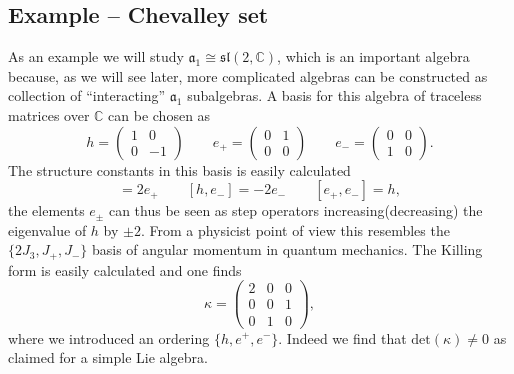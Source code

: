 \documentclass[11pt]{report}
\begin{document}
\subsection{Example -- Chevalley set}
As an example we will study $\mathfrak{a}_1\cong\mathfrak{sl}(2,\mathbb{C})$, which is an important algebra because, as we will see later, more complicated algebras can be constructed as collection of ``interacting'' $\mathfrak{a}_1$ subalgebras. A basis for this algebra of traceless matrices over $\mathbb{C}$ can be chosen as 
\begin{equation}
    h=\begin{pmatrix}1&0\\0 &-1\end{pmatrix}\qquad e_+=\begin{pmatrix}0&1\\0 &0\end{pmatrix}\qquad e_-=\begin{pmatrix}0&0\\1 &0\end{pmatrix}.
\end{equation}
The structure constants in this basis is easily calculated 
\begin{equation}
    [h,e_+] = 2e_+\qquad [h,e_-]=-2e_- \qquad [e_+,e_-]=h,
\end{equation}
the elements $e_{\pm}$ can thus be seen as step operators increasing(decreasing) the eigenvalue of $h$ by $\pm 2$. From a physicist point of view this resembles the $\{2J_3,J_+,J_-\}$ basis of angular momentum in quantum mechanics. The Killing form is easily calculated and one finds 
\begin{equation}
    \kappa = \begin{pmatrix}2&0&0\\0&0&1\\0&1&0\end{pmatrix},
\end{equation}
where we introduced an ordering $\{h,e^+,e^-\}$. Indeed we find that $\text{det}(\kappa)\neq 0$ as claimed for a simple Lie algebra.
\end{document}
